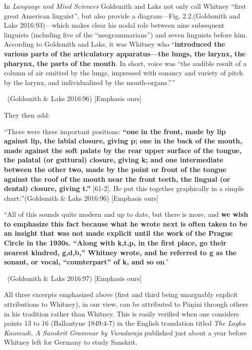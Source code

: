 \begin{myquote}
In \textit{Language and Mind Sciences} Goldsmith and Laks not only call Whitney “first great American linguist”, but also provide a diagram—Fig. 2.2.(Goldsmith and Laks 2016:93)—which makes clear his nodal role between nine subsequent linguists (including five of the “neogrammarians”) and seven linguists before him. According to Goldsmith and Laks, it was Whitney who “\textbf{introduced the various parts of the articulatory apparatus—the lungs, the larynx, the pharynx, the parts of the mouth}. In short, voice was “the audible result of a column of air emitted by the lungs, impressed with sonancy and variety of pitch by the larynx, and individualized by the mouth-organs.””

~\hfill (Goldsmith \& Laks 2016:96) [Emphasis ours]
\end{myquote}

They then add:

\vskip 2pt

\begin{myquote}
“There were three important positions: \textbf{“one in the front, made by lip against lip, the labial closure, giving p; one in the back of the mouth, made against the soft palate by the rear upper surface of the tongue, the palatal (or guttural) closure, giving k; and one intermediate between the other two, made by the point or front of the tongue against the roof of the mouth near the front teeth, the lingual (or dental) closure, giving t.”} [61-2]. He put this together graphically in a simple chart:”\hfill (Goldsmith \& Laks 2016:96) [Emphasis ours]
\end{myquote}

\vskip 3pt

\begin{myquote}
“All of this sounds quite modern and up to date, but there is more, and \textbf{we wish to emphasize this fact because what he wrote next is often taken to be an insight that was not made explicit until the work of the Prague Circle in the 1930s. “Along with k,t,p, in the first place, go their nearest kindred, g,d,b,” Whitney wrote, and he referred to g as the sonant, or vocal, “counterpart” of k, and so on}.”

~\hfill (Goldsmith \& Laks 2016:97) [Emphasis ours]
\end{myquote}

All three excerpts emphasized above (first and third being unarguably explicit attributions to Whitney), in our view, can be attributed to Pāṇini through others in his tradition rather than Whitney. This is easily verified when one considers points 13 to 16 (Ballantyne 1849:4-7) in the English translation titled \textit{The Laghu Kaumudi, A Sanskrit Grammar by Varadaraja} published just about a year before Whitney left for Germany to study Sanskrit.



